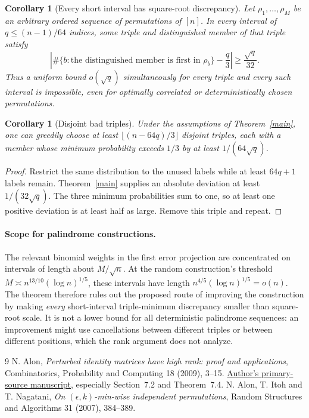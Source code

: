 \documentclass[11pt]{article}
\newtheorem{corollary}[theorem]{Corollary}
\begin{document}
\begin{corollary}[Every short interval has square-root discrepancy]
Let $\rho_1,\ldots,\rho_M$ be an arbitrary ordered sequence of
permutations of $[n]$. In every interval of $q\le(n-1)/64$ indices,
some triple and distinguished member of that triple satisfy
\[
 \left|\#\{b:\text{the distinguished member is first in }\rho_b\}
                    -\frac q3\right|\ge\frac{\sqrt q}{32}.
\]
Thus a uniform bound $o(\sqrt q)$ simultaneously for every triple and
every such interval is impossible, even for optimally correlated or
deterministically chosen permutations.
\end{corollary}

\begin{corollary}[Disjoint bad triples]
Under the assumptions of Theorem~\ref{main}, one can greedily choose at
least $\lfloor(n-64q)/3\rfloor$ disjoint triples, each with a member whose
minimum probability exceeds $1/3$ by at least $1/(64\sqrt q)$.
\end{corollary}
\begin{proof}
Restrict the same distribution to the unused labels while at least
$64q+1$ labels remain. Theorem~\ref{main} supplies an absolute deviation
at least $1/(32\sqrt q)$. The three minimum probabilities sum to one,
so at least one positive deviation is at least half as large. Remove
this triple and repeat.
\end{proof}

\paragraph{Scope for palindrome constructions.}
The relevant binomial weights in the first error projection are
concentrated on intervals of length about $M/\sqrt n$. At the random
construction's threshold $M\asymp n^{13/10}(\log n)^{1/5}$, these
intervals have length $n^{4/5}(\log n)^{1/5}=o(n)$. The theorem therefore
rules out the proposed route of improving the construction by making
\emph{every} short-interval triple-minimum discrepancy smaller than
square-root scale. It is not a lower bound for all deterministic
palindrome sequences: an improvement might use cancellations between
different triples or between different positions, which the rank
argument does not analyze.
\begin{thebibliography}{9}
N. Alon, \emph{Perturbed identity matrices have high rank: proof and
applications}, Combinatorics, Probability and Computing 18 (2009), 3--15.
\href{https://web.math.princeton.edu/~nalon/PDFS/identity1.pdf}{Author's
primary-source manuscript}, especially Section~7.2 and Theorem~7.4.
N. Alon, T. Itoh and T. Nagatani,
\emph{On $(\epsilon,k)$-min-wise independent permutations},
Random Structures and Algorithms 31 (2007), 384--389.
\end{thebibliography}
\end{document}
